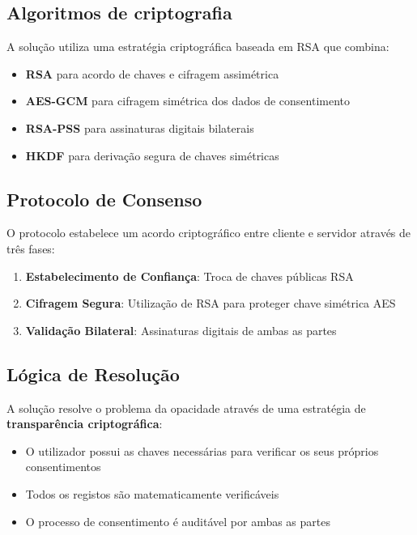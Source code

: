 \subsection{Algoritmos de criptografia}

A solução utiliza uma estratégia criptográfica baseada em RSA que combina:

\begin{itemize}
    \item \textbf{RSA} para acordo de chaves e cifragem assimétrica
    \item \textbf{AES-GCM} para cifragem simétrica dos dados de consentimento
    \item \textbf{RSA-PSS} para assinaturas digitais bilaterais
    \item \textbf{HKDF} para derivação segura de chaves simétricas
\end{itemize}

\subsection{Protocolo de Consenso}

O protocolo estabelece um acordo criptográfico entre cliente e servidor através de três fases:

\begin{enumerate}
    \item \textbf{Estabelecimento de Confiança}: Troca de chaves públicas RSA
    \item \textbf{Cifragem Segura}: Utilização de RSA para proteger chave simétrica AES
    \item \textbf{Validação Bilateral}: Assinaturas digitais de ambas as partes
\end{enumerate}

\subsection{Lógica de Resolução}

A solução resolve o problema da opacidade através de uma estratégia de \textbf{transparência criptográfica}:

\begin{itemize}
    \item O utilizador possui as chaves necessárias para verificar os seus próprios consentimentos
    \item Todos os registos são matematicamente verificáveis
    \item O processo de consentimento é auditável por ambas as partes
\end{itemize}

